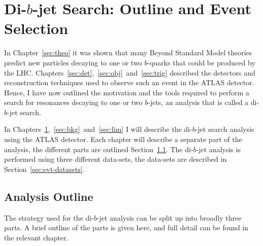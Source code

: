 \chapter{Di-$b$-jet Search: Outline and Event Selection}
\label{sec:evt}

In Chapter~\ref{sec:theo} it was shown that many Beyond Standard Model theories
predict new particles decaying to one or two $b$-quarks that could be produced by the LHC.
Chapters~\ref{sec:det},~\ref{sec:obj}~and~\ref{sec:trig}
described the detectors and reconstruction techniques used to observe such an event in the ATLAS detector.
Hence, I have now outlined the motivation and the tools required to perform
a search for resonances decaying to one or two $b$-jets,
an analysis that is called a di-$b$-jet search.

In Chapters~\ref{sec:evt},~\ref{sec:bkg}~and~\ref{sec:lim}
I will describe the di-$b$-jet search analysis using the ATLAS detector.
Each chapter will describe a separate part of the analysis,
the different parts are outlined Section~\ref{sec:evt-outline}.
The di-$b$-jet analysis is performed using three different data-sets,
the data-sets are described in Section~\ref{sec:evt-datasets}.

\section{Analysis Outline}
\label{sec:evt-outline}

The strategy used for the di-$b$-jet analysis
can be split up into broadly three parts.
A brief outline of the parts is given here,
and full detail can be found in the relevant chapter.

